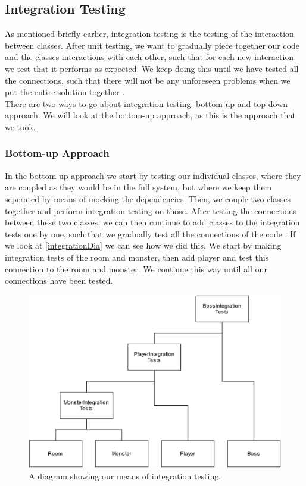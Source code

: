 \subsection{Integration Testing}
As mentioned briefly earlier, integration testing is the testing of the interaction between classes. After unit testing, we want to gradually piece together our code and the classes interactions with each other, such that for each new interaction we test that it performs as expected. We keep doing this until we have tested all the connections, such that there will not be any unforeseen problems when we put the entire solution together \cite{TestingBlackbox}. \\
There are two ways to go about integration testing: bottom-up and top-down approach. We will look at the bottom-up approach, as this is the approach that we took. 
\subsubsection{Bottom-up Approach}
In the bottom-up approach we start by testing our individual classes, where they are coupled as they would be in the full system, but where we keep them seperated by means of mocking the dependencies. Then, we couple two classes together and perform integration testing on those. After testing the connections between these two classes, we can then continue to add classes to the integration tests one by one, such that we gradually test all the connections of the code \cite{TestingBlackbox}. If we look at \autoref{integrationDia} we can see how we did this. We start by making integration tests of the room and monster, then add player and test this connection to the room and monster. We continue this way until all our connections have been tested. 
\begin{figure}
    \centering
    \includegraphics[width=0.7\linewidth]{Materials/TestingTheory/IntegrationDiagram}
    \caption{A diagram showing our means of integration testing.}
    \label{integrationDia}
\end{figure}
